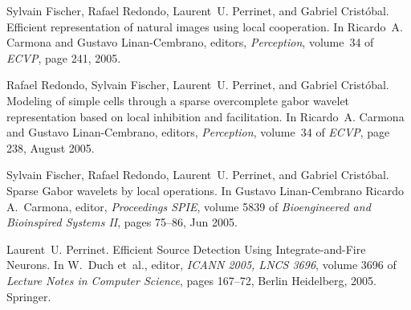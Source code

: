 \documentclass[11pt,french,a4paper,oneside]{article}%
\begin{document}
\begin{etaremune}
\item %
Sylvain Fischer, Rafael Redondo, Laurent~U. Perrinet, and Gabriel
  Crist{\'o}bal.
\newblock Efficient representation of natural images using local cooperation.
\newblock In Ricardo~A. Carmona and Gustavo Linan-Cembrano, editors,
  \emph{Perception}, volume~34 of \emph{E{CVP}}, page 241, 2005.

\item %
Rafael Redondo, Sylvain Fischer, Laurent~U. Perrinet, and Gabriel
  Crist{\'o}bal.
\newblock Modeling of simple cells through a sparse overcomplete gabor wavelet
  representation based on local inhibition and facilitation.
\newblock In Ricardo~A. Carmona and Gustavo Linan-Cembrano, editors,
  \emph{Perception}, volume~34 of \emph{ECVP}, page 238, August 2005.



\item %
Sylvain Fischer, Rafael Redondo, Laurent~U. Perrinet, and Gabriel
  Crist{\'o}bal.
\newblock Sparse {G}abor wavelets by local operations.
\newblock In Gustavo Linan-Cembrano Ricardo A.~Carmona, editor,
  \emph{Proceedings {SPIE}}, volume 5839 of \emph{Bioengineered and Bioinspired
  Systems II}, pages 75--86, Jun 2005.

\item %
Laurent~U. Perrinet.
\newblock Efficient {S}ource {D}etection {U}sing {I}ntegrate-and-{F}ire
  {N}eurons.
\newblock In W.~Duch et~al., editor, \emph{I{CANN} 2005, {LNCS} 3696}, volume
  3696 of \emph{Lecture Notes in Computer Science}, pages 167--72, Berlin
  Heidelberg, 2005. Springer.


\end{etaremune}
\end{document}
